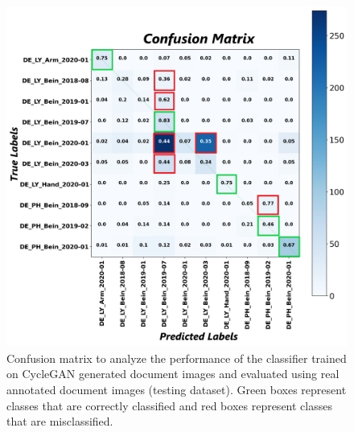 \begin{figure}[H]
    \begin{center}
	\includegraphics[scale=0.20]{images/Evaluation/Confusion_Matrix_CycleGAN_Generated_Data_Classifier_2021-06-02_21-55-39.png}
	\caption[Confusion matrix to analyze the performance of the classifier trained on \ac{CycleGAN} generated document images and evaluated using real annotated document images (test dataset).]{Confusion matrix to analyze the performance of the classifier trained on \ac{CycleGAN} generated document images and evaluated using real annotated document images (testing dataset). Green boxes represent classes that are correctly classified and red boxes represent classes that are misclassified.}
	\label{fig:CMCycleganGeneratedDocumentImagesClassifier}
	\end{center}
\end{figure}

